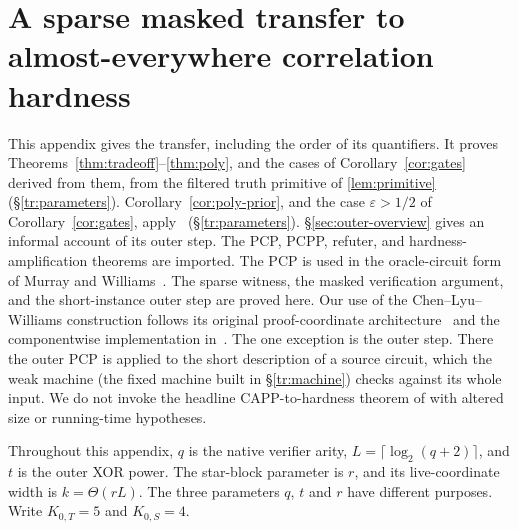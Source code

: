 \documentclass[11pt,letterpaper]{article}
\theoremstyle{definition}
\theoremstyle{remark}
\begin{document}
\section{A sparse masked transfer to almost-everywhere correlation hardness}
\label{tr:appendix}

This appendix gives the transfer, including the order of its quantifiers.
It proves Theorems~\ref{thm:tradeoff}--\ref{thm:poly}, and the cases of
Corollary~\ref{cor:gates} derived from them, from the filtered truth
primitive of \cref{lem:primitive} (\S\ref{tr:parameters}).
Corollary~\ref{cor:poly-prior}, and the case $\varepsilon>1/2$ of
Corollary~\ref{cor:gates}, apply~\cite[Theorem~2.3]{NagCubic}
(\S\ref{tr:parameters}). \S\ref{sec:outer-overview} gives an informal
account of its outer step.
The PCP, PCPP, refuter, and hardness-amplification theorems are imported.
The PCP is used in the oracle-circuit form of Murray and
Williams~\cite{MW20}. The sparse witness, the masked
verification argument, and the short-instance outer step are proved here.
Our use of the Chen--Lyu--Williams construction follows its original
proof-coordinate architecture~\cite[Section~6.2]{CLW} and the
componentwise implementation in~\cite[Appendix~C]{NagCubic}. The one
exception is the outer step. There the outer PCP is applied to the
short description of a source circuit, which the weak machine (the
fixed machine built in \S\ref{tr:machine}) checks against its whole
input. We do not invoke the headline CAPP-to-hardness theorem of
\cite{CLW} with altered size or running-time hypotheses.

Throughout this appendix, $q$ is the native verifier arity,
$L=\lceil\log_2(q+2)\rceil$, and $t$ is the outer XOR power.
The star-block parameter is $r$, and its live-coordinate width is
$k=\Theta(rL)$. The three parameters $q$, $t$ and $r$ have different
purposes.
Write $K_{0,T}=5$ and $K_{0,S}=4$.
\end{document}
